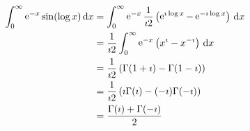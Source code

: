 {%
\begin{Solution}
  \begin{align*}
    \int_0^\infty \mathop{\mathrm{e}}\nolimits^{-x} \sin(\log x) \,\mathrm{d} x
    &= \int_0^\infty \mathop{\mathrm{e}}\nolimits^{-x} \frac{1}{\imath 2} \left( \mathop{\mathrm{e}}\nolimits^{\imath \log x} - \mathop{\mathrm{e}}\nolimits^{-\imath \log x}
    \right) \,\mathrm{d} x \\
    &= \frac{1}{\imath 2} \int_0^\infty \mathop{\mathrm{e}}\nolimits^{-x} \left( x^\imath - x^{-\imath} \right) \,\mathrm{d} x \\
    &= \frac{1}{\imath 2} \left( \Gamma(1 + \imath) - \Gamma(1 - \imath) \right) \\
    &= \frac{1}{\imath 2} \left( \imath \Gamma(\imath) - (- \imath) \Gamma(- \imath) \right) \\
    &= \frac{\Gamma(\imath) + \Gamma(- \imath) }{2}
  \end{align*}
\end{Solution}







\raggedbottom
}
